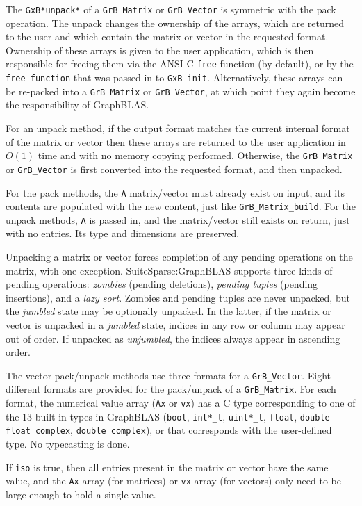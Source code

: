 \documentclass[12pt]{article}
\begin{document}
The \verb'GxB*unpack*' of a \verb'GrB_Matrix' or \verb'GrB_Vector' is symmetric with the
pack operation.  The unpack changes the ownership of the arrays, which are
returned to the user and which contain the
matrix or vector in the requested format.  Ownership of these arrays is given
to the user application, which is then responsible for freeing them via the
ANSI C \verb'free' function (by default), or by the \verb'free_function' that
was passed in to \verb'GxB_init'.  Alternatively, these arrays can be
re-packed into a \verb'GrB_Matrix' or \verb'GrB_Vector', at which point they
again become the responsibility of GraphBLAS.

For an unpack method, if the output format matches the current internal format of the
matrix or vector then these arrays are returned to the user application in
$O(1)$ time and with no memory copying performed.  Otherwise, the
\verb'GrB_Matrix' or \verb'GrB_Vector' is first converted into the requested
format, and then unpacked.

For the pack methods, the \verb'A' matrix/vector must already exist on input, and its contents are
populated with the new content, just like \verb'GrB_Matrix_build'.
For the unpack
methods, \verb'A' is passed in, and the matrix/vector still exists on return,
just with no entries.  Its type and dimensions are preserved.

Unpacking a matrix or vector forces completion of any pending
operations on the matrix, with one exception.  SuiteSparse:GraphBLAS supports
three kinds of pending operations: {\em zombies} (pending deletions), {\em
pending tuples} (pending insertions), and a {\em lazy sort}.  Zombies and
pending tuples are never unpacked, but the {\em jumbled} state may be
optionally unpacked.  In the latter, if the matrix or vector is unpacked in a
{\em jumbled} state, indices in any row or column may appear out of order.  If
unpacked as {\em unjumbled}, the indices always appear in ascending order.

The vector pack/unpack methods use three formats for a
\verb'GrB_Vector'.  Eight different formats are provided for the
pack/unpack of a \verb'GrB_Matrix'.  For each format, the
numerical value array (\verb'Ax' or \verb'vx') has a C type corresponding to
one of the 13 built-in types in GraphBLAS (\verb'bool', \verb'int*_t',
\verb'uint*_t', \verb'float', \verb'double' \verb'float complex', \verb'double complex'),
or that corresponds with the user-defined type.  No typecasting is
done.

If \verb'iso' is true, then all entries present in the matrix or vector
have the same value, and the \verb'Ax' array (for matrices) or \verb'vx' array
(for vectors) only need to be large enough to hold a single value.
\end{document}
